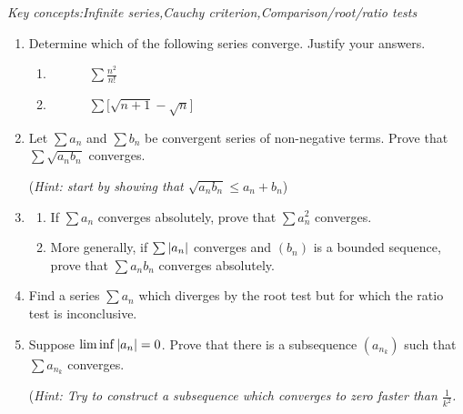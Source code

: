 \begin{exercises}{}{}
	\emph{Key concepts:\quad Infinite series,\quad Cauchy criterion,\quad Comparison/root/ratio tests}

	\begin{enumerate}
    \item%
		Determine which of the following series converge. Justify your answers.%
		\begin{enumerate}
			\item {} \  
			 \ 
			 \ 
			 \
			$\sum\frac{n^2}{n!}$
			\setcounter{enumii}{5}
			\item {} \ 
			 \ 
			 \
			 \
			$\sum \bigl[\sqrt{n+1}-\sqrt n\bigr]$
		\end{enumerate}
		
  
	   \item%
	   Let $\sum a_n$ and $\sum b_n$ be convergent series of non-negative terms. Prove that $\sum \sqrt{a_nb_n}$ converges.\par
	  	(\emph{Hint: start by showing that $\sqrt{a_nb_n}\le a_n+b_n$})
	  
  
  
	  \item%
	  \label{exs:seriesmult}
	  \begin{enumerate}
	    \item If $\sum a_n$ converges absolutely, prove that $\sum a_n^2$ converges.
	    \item More generally, if $\sum\left| a_n\right|$ converges and $(b_n)$ is a bounded sequence, prove that $\sum a_nb_n$ converges absolutely.
	  \end{enumerate}
	  
	  
	  \item%
		Find a series $\sum a_n$ which diverges by the root test but for which the ratio test is inconclusive.
	  
	  
	  \item%
	  Suppose $\liminf\left| a_n\right|=0$. Prove that there is a subsequence $(a_{n_k})$ such that $\sum a_{n_k}$ converges.\par
	  (\emph{Hint: Try to construct a subsequence which converges to zero faster than $\frac 1{k^2}$.}
	  

\end{enumerate}
\end{exercises}
